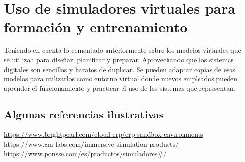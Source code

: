 \documentclass[spanish,12pt,a4paper,final,oneside]{book}
\begin{document}
\section{Uso de simuladores virtuales para formación y entrenamiento}
Teniendo en cuenta lo comentado anteriormente sobre los modelos virtuales que se utilizan para diseñar, planificar y preparar. Aprovechando que los sistemas digitales son sencillos y baratos de duplicar. Se pueden adaptar copias de esos modelos para utilizarlos como entorno virtual donde nuevos empleados pueden aprender el funcionamiento y practicar el uso de los sistemas que representan.

\subsection*{Algunas referencias ilustrativas}
\url{https://www.brightpearl.com/cloud-erp/erp-sandbox-environments}
\\ \url{https://www.cm-labs.com/immersive-simulation-products/}
\\ \url{https://www.ponsse.com/es/productos/simuladores#/}

  
\newpage  
\end{document}
